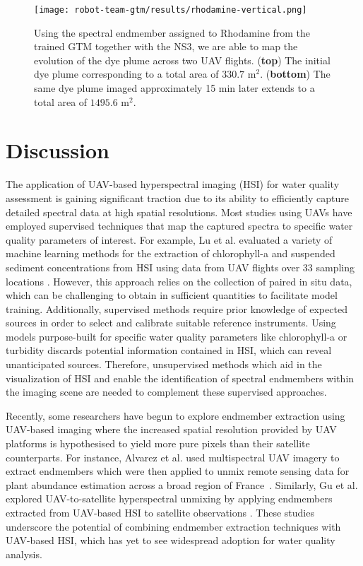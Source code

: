 \begin{figure}[H]
  \vspace{-1cm}
  \centering
  \texttt{[image: robot-team-gtm/results/rhodamine-vertical.png]}
  \caption{Using the spectral endmember assigned to Rhodamine from the trained
    GTM together with the NS3, we are able to map the evolution of the dye plume
    across two UAV flights. (\textbf{top}) The initial dye plume corresponding
    to a total area of $330.7$ m$^2$. (\textbf{bottom}) The same dye plume
    imaged approximately 15 min later extends to a total area of $1495.6$
    m$^2$.}
  \label{fig:rhodamine-map}
\end{figure}

\clearpage
\newpage



\section{Discussion}

The application of UAV-based hyperspectral imaging (HSI) for water quality assessment is gaining significant traction due to its ability to efficiently capture detailed spectral data at high spatial resolutions. Most studies using UAVs have employed supervised techniques that map the captured spectra to specific water quality parameters of interest. For example, Lu et al. evaluated a variety of machine learning methods for the extraction of chlorophyll-a and suspended sediment concentrations from HSI using data from UAV flights over 33 sampling locations \cite{lu2021retrieval}. However, this approach relies on the collection of paired in situ data, which can be challenging to obtain in sufficient quantities to facilitate model training. Additionally, supervised methods require prior knowledge of expected sources in order to select and calibrate suitable reference instruments. Using models purpose-built for specific water quality parameters like chlorophyll-a or turbidity discards potential information contained in HSI, which can reveal unanticipated sources. Therefore, unsupervised methods which aid in the visualization of HSI and enable the identification of spectral endmembers within the imaging scene are needed to complement these supervised approaches.

Recently, some researchers have begun to explore endmember extraction using UAV-based imaging where the increased spatial resolution provided by UAV platforms is hypothesised to yield more pure pixels than their satellite counterparts. For instance, Alvarez et al. used multispectral UAV imagery to extract endmembers which were then applied to unmix remote sensing data for plant abundance estimation across a broad region of France~\cite{alvarez2020can}. Similarly, Gu et al. explored UAV-to-satellite hyperspectral unmixing by applying endmembers extracted from UAV-based HSI to satellite observations \cite{gu2023intrinsic}. These studies underscore the potential of combining endmember extraction techniques with UAV-based HSI, which has yet to see widespread adoption for water quality analysis.

